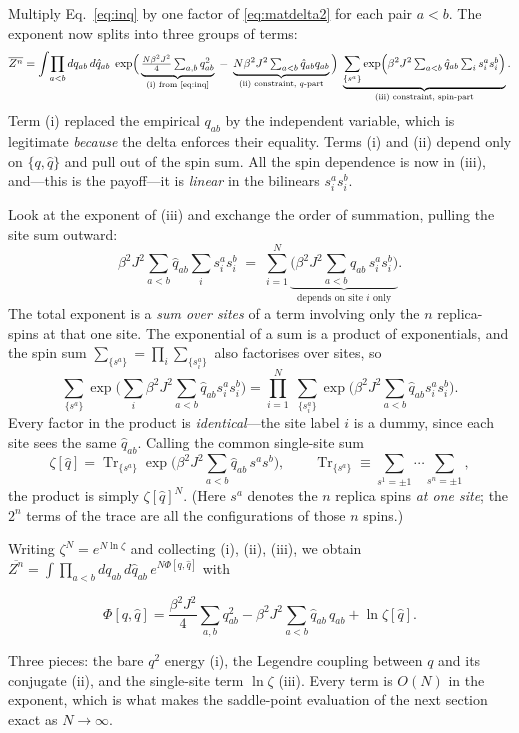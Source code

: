 \documentclass[nobib,justified]{tufte-handout}
\newcommand{\dbar}[1]{\overline{#1}}
\newcommand{\Tr}{\operatorname{Tr}}
\begin{document}
\newthought{Insert into $\dbar{Z^n}$.} Multiply
Eq.~\eqref{eq:inq} by one factor of \eqref{eq:matdelta2} for each pair
$a<b$. The exponent now splits into three groups of terms:
\begin{equation}\label{eq:split}
  \dbar{Z^n}
  = \int\!\prod_{a<b}dq_{ab}\,d\hat q_{ab}\;
    \exp\!\Big(
      \underbrace{\tfrac{N\beta^2 J^2}{4}\textstyle\sum_{a,b}q_{ab}^2}_{\text{(i) from \eqref{eq:inq}}}
      \;-\;
      \underbrace{N\beta^2 J^2\textstyle\sum_{a<b}\hat q_{ab}q_{ab}}_{\text{(ii) constraint, $q$-part}}
    \Big)\;
    \underbrace{\sum_{\{s^a\}}\exp\!\Big(\beta^2 J^2\textstyle\sum_{a<b}\hat q_{ab}\sum_i s_i^a s_i^b\Big)}_{\text{(iii) constraint, spin-part}} .
\end{equation}
Term (i) replaced the empirical $q_{ab}$ by the independent variable, which
is legitimate \emph{because} the delta enforces their equality. Terms (i)
and (ii) depend only on $\{q,\hat q\}$ and pull out of the spin sum. All the
spin dependence is now in (iii), and---this is the payoff---it is
\emph{linear} in the bilinears $s_i^a s_i^b$.

 Look at the exponent
of (iii) and exchange the order of summation, pulling the site sum
outward:
\[
  \beta^2 J^2\sum_{a<b}\hat q_{ab}\sum_i s_i^a s_i^b
  \;=\;
  \sum_{i=1}^N \underbrace{\Big(\beta^2 J^2\sum_{a<b}\hat q_{ab}\,s_i^a s_i^b\Big)}_{\text{depends on site $i$ only}} .
\]
The total exponent is a \emph{sum over sites} of a term involving only the
$n$ replica-spins at that one site. The exponential of a sum is a product
of exponentials, and the spin sum $\sum_{\{s^a\}}=\prod_i\sum_{\{s_i^a\}}$
also factorises over sites, so
\[
  \sum_{\{s^a\}}\exp\!\Big(\sum_i \beta^2 J^2\!\sum_{a<b}\hat q_{ab}s_i^a s_i^b\Big)
  =\prod_{i=1}^N\;\sum_{\{s_i^a\}}\exp\!\Big(\beta^2 J^2\!\sum_{a<b}\hat q_{ab}s_i^a s_i^b\Big).
\]
Every factor in the product is \emph{identical}---the site label $i$ is a
dummy, since each site sees the same $\hat q_{ab}$. Calling the common
single-site sum
\begin{equation}\label{eq:zeta}
  \zeta[\hat q]
  = \Tr_{\{s^a\}}\exp\!\Big(\beta^2 J^2\sum_{a<b}\hat q_{ab}\,s^a s^b\Big),
  \qquad \Tr_{\{s^a\}}\equiv\!\!\sum_{s^1=\pm1}\!\!\cdots\!\!\sum_{s^n=\pm1},
\end{equation}
the product is simply $\zeta[\hat q]^N$. (Here $s^a$ denotes the $n$ replica
spins \emph{at one site}; the $2^n$ terms of the trace are all the
configurations of those $n$ spins.)

 Writing $\zeta^N=e^{N\ln\zeta}$ and collecting
(i), (ii), (iii), we obtain $\dbar{Z^n}=\int\!\prod_{a<b}dq_{ab}\,
d\hat q_{ab}\,e^{N\Phi[q,\hat q]}$ with
\begin{keyresult}
\[
  \Phi[q,\hat q]
  = \frac{\beta^2 J^2}{4}\sum_{a,b} q_{ab}^2
  - \beta^2 J^2\sum_{a<b}\hat q_{ab}\,q_{ab}
  + \ln\zeta[\hat q].
\]
\end{keyresult}
\noindent
Three pieces: the bare $q^2$ energy (i), the Legendre coupling between $q$
and its conjugate (ii), and the single-site term $\ln\zeta$ (iii). Every
term is $O(N)$ in the exponent, which is what makes the saddle-point
evaluation of the next section exact as $N\to\infty$.
\end{document}
